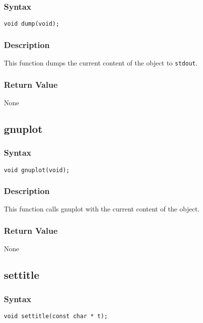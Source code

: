 \documentclass[11pt,fleqn,letterpaper]{report}
\begin{document}
\subsubsection*{Syntax}
\begin{verbatim}
void dump(void);
\end{verbatim}
\subsubsection*{Description}
This function dumps the current content of the object to {\tt stdout}.

\subsubsection*{Return Value}

None

\newpage

\subsection*{gnuplot}
\subsubsection*{Syntax}
\begin{verbatim}
void gnuplot(void);
\end{verbatim}
\subsubsection*{Description}
This function calls \textsf{gnuplot} with the current content of the object.

\subsubsection*{Return Value}

None

\newpage

\subsection*{settitle}
\subsubsection*{Syntax}
\begin{verbatim}
void settitle(const char * t);
\end{verbatim}
\end{document}

